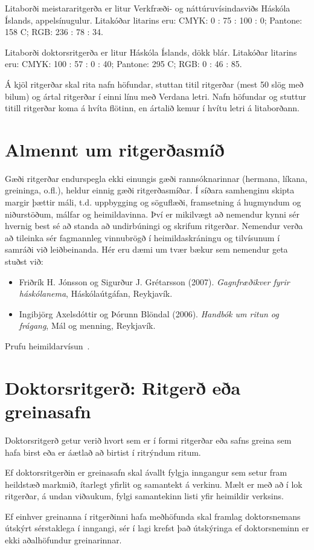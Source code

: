 \documentclass[a4paper, 12pt, twoside]{scrreprt}
\begin{document}
Litaborði meistararitgerða er litur Verkfræði- og náttúruvísindasviðs Háskóla Íslands, appelsínugulur. Litakóðar litarins eru: CMYK:  0 : 75 : 100 : 0; Pantone: 158 C; RGB: 236 : 78 : 34.

Litaborði doktorsritgerða er litur Háskóla Íslands, dökk blár. Litakóðar litarins eru: CMYK: 100 : 57 : 0 : 40; Pantone: 295 C; RGB: 0 : 46 : 85.

Á kjöl ritgerðar skal rita nafn höfundar, stuttan titil ritgerðar (mest 50 slög með bilum) og ártal ritgerðar í einni línu með Verdana letri. Nafn höfundar og stuttur titill ritgerðar koma á hvíta flötinn, en ártalið kemur í hvítu letri á litaborðann.

\section{Almennt um ritgerðasmíð}
Gæði ritgerðar endurspegla ekki einungis gæði rannsóknarinnar (hermana, líkana, greininga, o.fl.), heldur einnig gæði ritgerðasmíðar. Í síðara samhenginu skipta margir þættir máli, t.d. uppbygging og söguflæði, framsetning á hugmyndum og niðurstöðum, málfar og heimildavinna. Því er mikilvægt að nemendur kynni sér hvernig best sé að standa að undirbúningi og skrifum ritgerðar. Nemendur verða að tileinka sér fagmannleg vinnubrögð í heimildaskráningu og tilvísunum í samráði við leiðbeinanda. Hér eru dæmi um tvær bækur sem nemendur geta stuðst við:
\begin{itemize}
 \item Friðrík H. Jónsson og Sigurður J. Grétarsson (2007). \textit{Gagnfræðikver fyrir háskólanema}, Háskólaútgáfan, Reykjavík.
 \item Ingibjörg Axelsdóttir og Þórunn Blöndal (2006).  \textit{Handbók um ritun og frágang},  Mál og menning, Reykjavík.
\end{itemize}
Prufu heimildarvísun~\cite{knuth-fa}.
\section{Doktorsritgerð: Ritgerð eða greinasafn}
Doktorsritgerð getur verið hvort sem er í formi ritgerðar eða safns greina sem hafa birst eða  er áætlað að birtist í ritrýndum ritum. 

Ef doktorsritgerðin er greinasafn skal ávallt fylgja inngangur sem setur fram heildstæð markmið, ítarlegt yfirlit og samantekt á verkinu. Mælt er með að í lok ritgerðar, á undan viðaukum, fylgi samantekinn listi yfir heimildir verksins.

Ef einhver greinanna í ritgerðinni hafa meðhöfunda skal framlag doktorsnemans útskýrt sérstaklega í inngangi, sér í lagi krefst það útskýringa ef doktorsneminn er ekki aðalhöfundur greinarinnar. 
\end{document}

